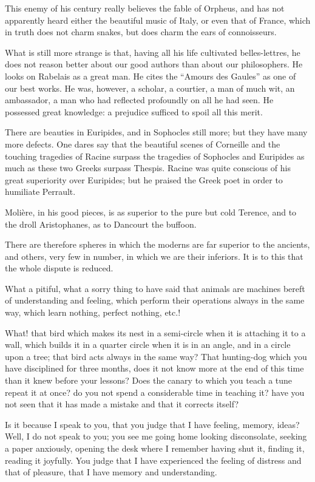This enemy of his century really believes the fable of Orpheus, and has
not apparently heard either the beautiful music of Italy, or even that
of France, which in truth does not charm snakes, but does charm the ears
of connoisseurs.

What is still more strange is that, having all his life cultivated
belles-lettres, he does not reason better about our good authors than
about our philosophers. He looks on Rabelais as a great man. He cites
the \enquote{Amours des Gaules} as one of our best works. He was, however, a
scholar, a courtier, a man of much wit, an ambassador, a man who had
reflected profoundly on all he had seen. He possessed great knowledge: a
prejudice sufficed to spoil all this merit.

There are beauties in Euripides, and in Sophocles still more; but they
have many more defects. One dares say that the beautiful scenes of
Corneille and the touching tragedies of Racine surpass the tragedies of
Sophocles and Euripides as much as these two Greeks surpass Thespis.
Racine was quite conscious of his great superiority over Euripides; but
he praised the Greek poet in order to humiliate Perrault.

Molière, in his good pieces, is as superior to the pure but cold
Terence, and to the droll Aristophanes, as to Dancourt the buffoon.

There are therefore spheres in which the moderns are far superior to the
ancients, and others, very few in number, in which we are their
inferiors. It is to this that the whole dispute is reduced.






What a pitiful, what a sorry thing to have said that animals are
machines bereft of understanding and feeling, which perform their
operations always in the same way, which learn nothing, perfect nothing,
etc.!

What! that bird which makes its nest in a semi-circle when it is
attaching it to a wall, which builds it in a quarter circle when it is
in an angle, and in a circle upon a tree; that bird acts always in the
same way? That hunting-dog which you have disciplined for three months,
does it not know more at the end of this time than it knew before your
lessons? Does the canary to which you teach a tune repeat it at once? do
you not spend a considerable time in teaching it? have you not seen that
it has made a mistake and that it corrects itself?

Is it because I speak to you, that you judge that I have feeling,
memory, ideas? Well, I do not speak to you; you see me going home
looking disconsolate, seeking a paper anxiously, opening the desk where
I remember having shut it, finding it, reading it joyfully. You judge
that I have experienced the feeling of distress and that of pleasure,
that I have memory and understanding.

